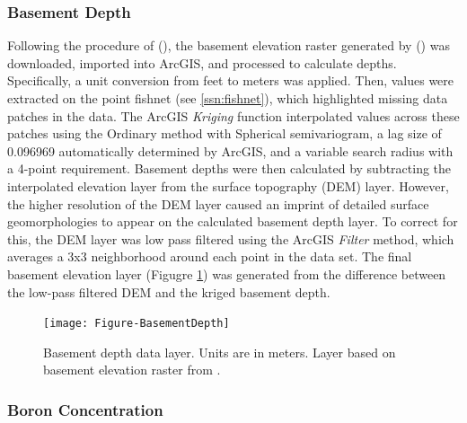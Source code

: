 \subsubsection{Basement Depth}

Following the procedure of \citeauthor{pepin_new_2018} (\citeyear{pepin_new_2018}), the basement elevation raster generated by \citeauthor{bielicki_hydrogeolgic_2015} (\citeyear{bielicki_hydrogeolgic_2015}) was downloaded, imported into ArcGIS, and processed to calculate depths. Specifically, a unit conversion from feet to meters was applied. Then, values were extracted on the point fishnet (see \ref{ssn:fishnet}), which highlighted missing data patches in the data. The ArcGIS \textit{Kriging} function interpolated values across these patches using the Ordinary method with Spherical semivariogram, a lag size of 0.096969 automatically determined by ArcGIS, and a variable search radius with a 4-point requirement. Basement depths were then calculated by subtracting the interpolated elevation layer from the surface topography (DEM) layer. However, the higher resolution of the DEM layer caused an imprint of detailed surface geomorphologies to appear on the calculated basement depth layer. To correct for this, the DEM layer was low pass filtered using the ArcGIS \textit{Filter} method, which averages a 3x3 neighborhood around each point in the data set. The final basement elevation layer (Figugre \ref{fig:feat_basementdepth}) was generated from the difference between the low-pass filtered DEM and the kriged basement depth.

\begin{figure}[h!]
\centering
\texttt{[image: Figure-BasementDepth]}
\caption[Basement depth data layer]{Basement depth data layer. Units are in meters. Layer based on basement elevation raster from \protect\citep{bielicki_hydrogeolgic_2015}.}
\label{fig:feat_basementdepth}
\end{figure}

\subsubsection{Boron Concentration}

